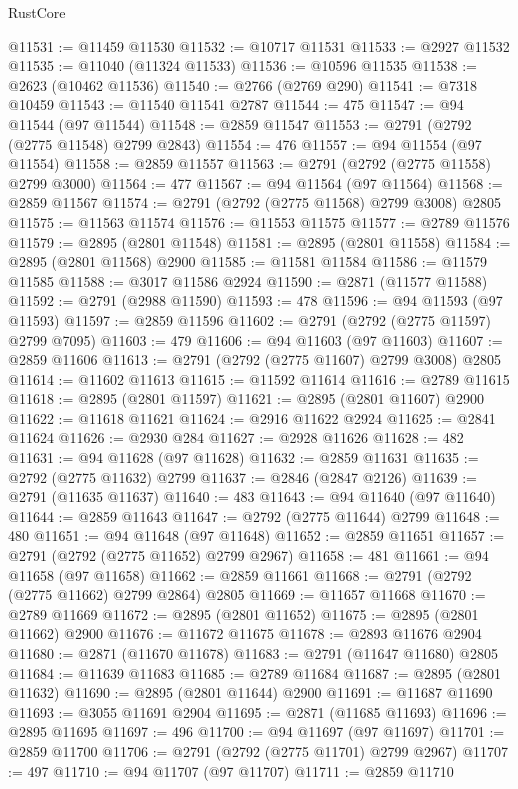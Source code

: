 \begin{lexlean}{RustCore}
\begin{coremodule}
@11531 := @11459 @11530
@11532 := @10717 @11531
@11533 := @2927 @11532
@11535 := @11040 (@11324 @11533)
@11536 := @10596 @11535
@11538 := @2623 (@10462 @11536)
@11540 := @2766 (@2769 @290)
@11541 := @7318 @10459
@11543 := @11540 @11541 @2787
@11544 := 475
@11547 := @94 @11544 (@97 @11544)
@11548 := @2859 @11547
@11553 := @2791 (@2792 (@2775 @11548) @2799 @2843)
@11554 := 476
@11557 := @94 @11554 (@97 @11554)
@11558 := @2859 @11557
@11563 := @2791 (@2792 (@2775 @11558) @2799 @3000)
@11564 := 477
@11567 := @94 @11564 (@97 @11564)
@11568 := @2859 @11567
@11574 := @2791 (@2792 (@2775 @11568) @2799 @3008) @2805
@11575 := @11563 @11574
@11576 := @11553 @11575
@11577 := @2789 @11576
@11579 := @2895 (@2801 @11548)
@11581 := @2895 (@2801 @11558)
@11584 := @2895 (@2801 @11568) @2900
@11585 := @11581 @11584
@11586 := @11579 @11585
@11588 := @3017 @11586 @2924
@11590 := @2871 (@11577 @11588)
@11592 := @2791 (@2988 @11590)
@11593 := 478
@11596 := @94 @11593 (@97 @11593)
@11597 := @2859 @11596
@11602 := @2791 (@2792 (@2775 @11597) @2799 @7095)
@11603 := 479
@11606 := @94 @11603 (@97 @11603)
@11607 := @2859 @11606
@11613 := @2791 (@2792 (@2775 @11607) @2799 @3008) @2805
@11614 := @11602 @11613
@11615 := @11592 @11614
@11616 := @2789 @11615
@11618 := @2895 (@2801 @11597)
@11621 := @2895 (@2801 @11607) @2900
@11622 := @11618 @11621
@11624 := @2916 @11622 @2924
@11625 := @2841 @11624
@11626 := @2930 @284
@11627 := @2928 @11626
@11628 := 482
@11631 := @94 @11628 (@97 @11628)
@11632 := @2859 @11631
@11635 := @2792 (@2775 @11632) @2799
@11637 := @2846 (@2847 @2126)
@11639 := @2791 (@11635 @11637)
@11640 := 483
@11643 := @94 @11640 (@97 @11640)
@11644 := @2859 @11643
@11647 := @2792 (@2775 @11644) @2799
@11648 := 480
@11651 := @94 @11648 (@97 @11648)
@11652 := @2859 @11651
@11657 := @2791 (@2792 (@2775 @11652) @2799 @2967)
@11658 := 481
@11661 := @94 @11658 (@97 @11658)
@11662 := @2859 @11661
@11668 := @2791 (@2792 (@2775 @11662) @2799 @2864) @2805
@11669 := @11657 @11668
@11670 := @2789 @11669
@11672 := @2895 (@2801 @11652)
@11675 := @2895 (@2801 @11662) @2900
@11676 := @11672 @11675
@11678 := @2893 @11676 @2904
@11680 := @2871 (@11670 @11678)
@11683 := @2791 (@11647 @11680) @2805
@11684 := @11639 @11683
@11685 := @2789 @11684
@11687 := @2895 (@2801 @11632)
@11690 := @2895 (@2801 @11644) @2900
@11691 := @11687 @11690
@11693 := @3055 @11691 @2904
@11695 := @2871 (@11685 @11693)
@11696 := @2895 @11695
@11697 := 496
@11700 := @94 @11697 (@97 @11697)
@11701 := @2859 @11700
@11706 := @2791 (@2792 (@2775 @11701) @2799 @2967)
@11707 := 497
@11710 := @94 @11707 (@97 @11707)
@11711 := @2859 @11710

\end{coremodule}
\end{lexlean}

